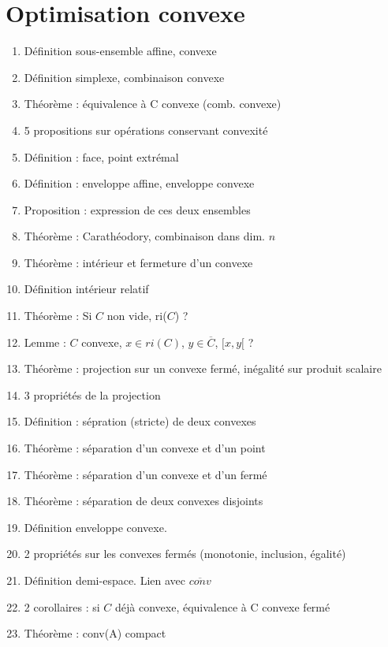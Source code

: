 \documentclass{article}
\begin{document}
\part{Optimisation convexe}
\begin{enumerate}
\section{Ensembles convexes}
	\item Définition sous-ensemble affine, convexe
	\item Définition simplexe, combinaison convexe
	\item Théorème : équivalence à C convexe (comb. convexe)
	\item 5 propositions sur opérations conservant convexité
	\item Définition : face, point extrémal
	\item Définition : enveloppe affine, enveloppe convexe
	\item Proposition : expression de ces deux ensembles
	\item Théorème : Carathéodory, combinaison dans dim. $n$
	\item Théorème : intérieur et fermeture d'un convexe
	\item Définition intérieur relatif
	\item Théorème : Si $C$ non vide, ri($C$) ?
	\item Lemme : $C$ convexe, $x\in ri(C)$, $y\in\overline{C}$, $[x,y[$ ?
	\item Théorème : projection sur un convexe fermé, inégalité sur produit scalaire
	\item 3 propriétés de la projection
	\item Définition : sépration (stricte) de deux convexes
	\item Théorème : séparation d'un convexe et d'un point
	\item Théorème : séparation d'un convexe et d'un fermé
	\item Théorème : séparation de deux convexes disjoints
	\item Définition enveloppe convexe.
	\item 2 propriétés sur les convexes fermés (monotonie, inclusion, égalité)
	\item Définition demi-espace. Lien avec $\overline{conv}$
	\item 2 corollaires : si $C$ déjà convexe, équivalence à C convexe fermé
	\item Théorème : conv(A) compact

\end{enumerate}
\end{document}
